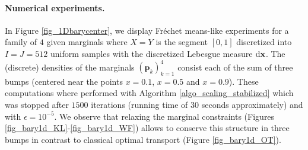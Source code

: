 %
%
%
\paragraph{Numerical experiments.}
In Figure \ref{fig_1Dbarycenter}, we display Fr\'echet means-like experiments for a family of $4$ given marginals where $X=Y$ is the segment $[0,1]$ discretized into $I=J=512$ uniform samples with the discretized Lebesgue measure $\mathbf{\mathrm{d} x}$. The (discrete) densities of the marginals $(\mathbf{p}_k)_{k=1}^4$ consist each of the sum of three bumps (centered near the points $x=0.1$, $x=0.5$ and $x=0.9$). These computations where performed with Algorithm \ref{algo_scaling_stabilized} which was stopped after $1500$ iterations (running time of $30$ seconds approximately) and with $\epsilon=10^{-5}$. We observe that relaxing the marginal constraints (Figures \ref{fig_bary1d_KL}-\ref{fig_bary1d_WF}) allows to conserve this structure in three bumps in contrast to classical optimal transport (Figure \ref{fig_bary1d_OT}).

